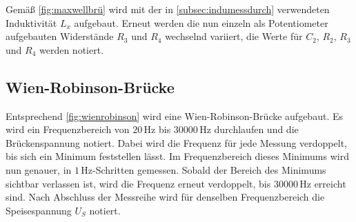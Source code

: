 Gemäß \autoref{fig:maxwellbrü} wird mit der in \autoref{subsec:indumessdurch} verwendeten 
Induktivität $L_x$ aufgebaut. 
Erneut werden die nun einzeln als Potentiometer aufgebauten Widerstände $R_3$ und $R_4$ wechselnd variiert,
die Werte für $C_2$, $R_2$, $R_3$ und $R_4$ werden notiert.


\subsection{Wien-Robinson-Brücke}

Entsprechend \autoref{fig:wienrobinson} wird eine Wien-Robinson-Brücke aufgebaut.
Es wird ein Frequenzbereich von $20 \, \unit{\hertz}$ bis $30000 \, \unit{\hertz}$ durchlaufen und die
Brückenspannung notiert.
Dabei wird die Frequenz für jede Messung verdoppelt, bis sich ein Minimum feststellen lässt.
Im Frequenzbereich dieses Minimums wird nun genauer, in $1 \, \unit{\hertz}$-Schritten gemessen.
Sobald der Bereich des Minimums sichtbar verlassen ist, wird die Frequenz erneut verdoppelt, bis 
$30000 \, \unit{\hertz}$ erreicht sind.
Nach Abschluss der Messreihe wird für denselben Frequenzbereich die Speisespannung $U_S$ notiert.


